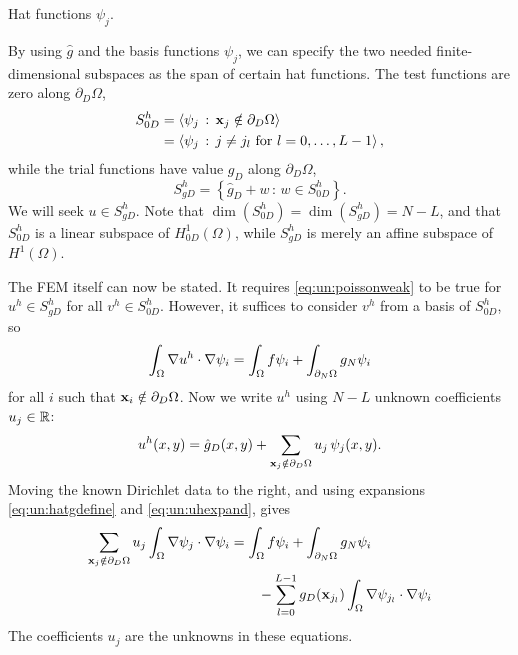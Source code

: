 \begin{marginfigure}

\caption{Hat functions $\psi_j$.}
\label{fig:un:hatfunction}
\end{marginfigure}

By using $\hat g$ and the basis functions $\psi_j$, we can specify the two needed finite-dimensional subspaces as the span of certain hat functions.  The test functions are zero along $\partial_D \Omega$,
\begin{align*}
S_{0D}^h &= \left<\psi_j \,:\, \mathbf{x}_j \notin \partial_D \Omega\right> \\
         &= \left<\psi_j \,:\, j \neq j_l \text{ for } l=0,\dots,L-1\right>,
\end{align*}
while the trial functions have value $g_D$ along $\partial_D \Omega$,
\begin{equation}
S_{gD}^h = \left\{\hat g_D + w \,:\, w \in S_{0D}^h\right\}.
\end{equation}
We will seek $u\in S_{gD}^h$.  Note that $\dim(S_{0D}^h)=\dim(S_{gD}^h)=N-L$, and that $S_{0D}^h$ is a linear subspace of $H_{0D}^1(\Omega)$, while $S_{gD}^h$ is merely an affine subspace of $H^1(\Omega)$.

The FEM itself can now be stated.  It requires \eqref{eq:un:poissonweak} to be true for $u^h\in S_{gD}^h$ for all $v^h\in S_{0D}^h$.  However, it suffices to consider $v^h$ from a basis of $S_{0D}^h$, so
\begin{equation}
\int_\Omega \nabla u^h \cdot \nabla \psi_i = \int_\Omega f \psi_i + \int_{\partial_N\Omega} g_N \psi_i
\end{equation}
for all $i$ such that $\mathbf{x}_i \notin \partial_D \Omega$.  Now we write $u^h$ using $N-L$ unknown coefficients $u_j\in\mathbb{R}$:
\begin{equation}
u^h(x,y) = \hat g_D(x,y) + \sum_{\mathbf{x}_j \notin \partial_D \Omega} u_j\, \psi_j(x,y). \label{eq:un:uhexpand}
\end{equation}
Moving the known Dirichlet data to the right, and using expansions \eqref{eq:un:hatgdefine} and \eqref{eq:un:uhexpand}, gives
\begin{align}
\sum_{\mathbf{x}_j \notin \partial_D \Omega} u_j \int_\Omega \nabla \psi_j \cdot \nabla \psi_i &= \int_\Omega f \psi_i + \int_{\partial_N\Omega} g_N \psi_i \label{eq:un:poissonfem} \\
&\qquad - \sum_{l=0}^{L-1} g_D(\mathbf{x}_{j_l})  \int_\Omega \nabla \psi_{j_l} \cdot \nabla \psi_i \notag
\end{align}
The coefficients $u_j$ are the unknowns in these equations.

